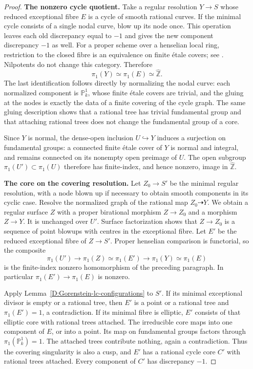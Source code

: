 \begin{proof}
\par\smallskip\noindent\textbf{The nonzero cycle quotient.}\quad
Take a regular resolution $Y\to S$ whose reduced exceptional
fibre $E$ is a cycle of smooth rational curves.  If the minimal
cycle consists of a single nodal curve, blow up its node once.
This operation leaves each old discrepancy equal to $-1$ and
gives the new component discrepancy $-1$ as well.
For a proper scheme over a henselian local ring, restriction
to the closed fibre is an equivalence on finite \'etale covers;
see \cite[Lemma 58.9.1, tag 0A48]{StacksBCuspLocal}.
Nilpotents do not change this category.  Therefore
\[
 \pi_1(Y)\simeq\pi_1(E)\simeq\widehat{\mathbb Z}.
\]
The last identification follows directly by normalizing the
nodal curve: each normalized component is $\mathbb P^1_k$,
whose finite \'etale covers are trivial, and the gluing at the
nodes is exactly the data of a finite covering of the cycle
graph.  The same gluing description shows that a rational tree
has trivial fundamental group and that attaching rational
trees does not change the fundamental group of a core.

Since $Y$ is normal, the dense-open inclusion $U\hookrightarrow Y$
induces a surjection on fundamental groups: a connected finite
\'etale cover of $Y$ is normal and integral, and remains
connected on its nonempty open preimage of $U$.
The open subgroup $\pi_1(U')\subset\pi_1(U)$ therefore has
finite-index, and hence nonzero, image in
$\widehat{\mathbb Z}$.

\par\smallskip\noindent\textbf{The core on the covering resolution.}\quad
Let $Z_0\to S'$ be the minimal regular resolution, with a node
blown up if necessary to obtain smooth components in its
cyclic case.  Resolve the normalized graph of the rational
map $Z_0\dashrightarrow Y$.  We obtain a regular surface $Z$
with a proper birational morphism $Z\to Z_0$ and a morphism
$Z\to Y$.  It is unchanged over $U'$.  Surface factorization
shows that $Z\to Z_0$ is a sequence of point blowups with
centres in the exceptional fibre.  Let $E'$ be the reduced
exceptional fibre of $Z\to S'$.
Proper henselian comparison is functorial, so the composite
\[
 \pi_1(U')\longrightarrow\pi_1(Z)
 \simeq\pi_1(E')\longrightarrow\pi_1(Y)
 \simeq\pi_1(E)
\]
is the finite-index nonzero homomorphism of the preceding
paragraph.  In particular $\pi_1(E')\to\pi_1(E)$ is nonzero.

Apply Lemma~\ref{D:Gorenstein-lc-configurations} to $S'$.
If its minimal exceptional divisor is empty or a rational tree,
then $E'$ is a point or a rational tree and $\pi_1(E')=1$,
a contradiction.
If its minimal fibre is elliptic, $E'$ consists of that
elliptic core with rational trees attached.  The irreducible
core maps into one component of $E$, or into a point.
Its map on fundamental groups factors through
$\pi_1(\mathbb P^1_k)=1$.  The attached trees contribute
nothing, again a contradiction.
Thus the covering singularity is also a cusp, and $E'$ has
a rational cycle core $C'$ with rational trees attached.
Every component of $C'$ has discrepancy $-1$.


\end{proof}
